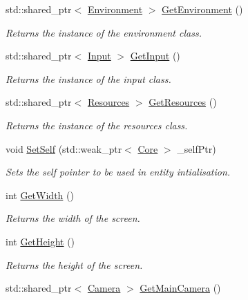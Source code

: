 \begin{DoxyCompactItemize}
std\+::shared\+\_\+ptr$<$ \hyperlink{classfrontier_1_1_environment}{Environment} $>$ \hyperlink{classfrontier_1_1_core_a38ded93a4688d58e6e3ef2cdd7694a7a}{Get\+Environment} ()
\begin{DoxyCompactList}\small\item\em Returns the instance of the environment class. \end{DoxyCompactList}\item 
std\+::shared\+\_\+ptr$<$ \hyperlink{classfrontier_1_1_input}{Input} $>$ \hyperlink{classfrontier_1_1_core_a4098db42dc9ad76fb1b7f579cea45bd2}{Get\+Input} ()
\begin{DoxyCompactList}\small\item\em Returns the instance of the input class. \end{DoxyCompactList}\item 
std\+::shared\+\_\+ptr$<$ \hyperlink{classfrontier_1_1_resources}{Resources} $>$ \hyperlink{classfrontier_1_1_core_af05275451ce494dd3df46ed97b6f643a}{Get\+Resources} ()
\begin{DoxyCompactList}\small\item\em Returns the instance of the resources class. \end{DoxyCompactList}\item 
void \hyperlink{classfrontier_1_1_core_a92669a2d7754db9bcf3ff600f54952ae}{Set\+Self} (std\+::weak\+\_\+ptr$<$ \hyperlink{classfrontier_1_1_core}{Core} $>$ \+\_\+self\+Ptr)
\begin{DoxyCompactList}\small\item\em Sets the self pointer to be used in entity intialisation. \end{DoxyCompactList}\item 
int \hyperlink{classfrontier_1_1_core_a92d5a3acd90860e5cdbbe0030a711b22}{Get\+Width} ()
\begin{DoxyCompactList}\small\item\em Returns the width of the screen. \end{DoxyCompactList}\item 
int \hyperlink{classfrontier_1_1_core_a30d2a3deec19493bba0e3a7a9d04a11b}{Get\+Height} ()
\begin{DoxyCompactList}\small\item\em Returns the height of the screen. \end{DoxyCompactList}\item 
std\+::shared\+\_\+ptr$<$ \hyperlink{classfrontier_1_1_camera}{Camera} $>$ \hyperlink{classfrontier_1_1_core_a78b3939fe11820a0c041c984a25107b3}{Get\+Main\+Camera} ()

\end{DoxyCompactItemize}
